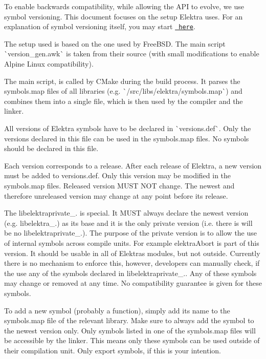 To enable backwards compatibility, while allowing the A\+PI to evolve, we use symbol versioning. This document focuses on the setup Elektra uses. For an explanation of symbol versioning itself, you may start \href{https://people.freebsd.org/~deischen/symver/library_versioning.txt}{\texttt{ here}}.

The setup used is based on the one used by Free\+B\+SD. The main script \`{}version\+\_\+gen.awk\`{} is taken from their source (with small modifications to enable Alpine Linux compatibility).

The main script, is called by C\+Make during the build process. It parses the {\ttfamily symbols.\+map} files of all libraries (e.\+g. \`{}/src/libs/elektra/symbols.map\`{}) and combines them into a single file, which is then used by the compiler and the linker.

All versions of Elektra symbols have to be declared in \`{}versions.def\`{}. Only the versions declared in this file can be used in the {\ttfamily symbols.\+map} files. No symbols should be declared in this file.

Each version corresponds to a release. After each release of Elektra, a new version must be added to {\ttfamily versions.\+def}. Only this version may be modified in the {\ttfamily symbols.\+map} files. Released version M\+U\+ST N\+OT change. The newest and therefore unreleased version may change at any point before its release.

The {\ttfamily libelektraprivate\+\_.} is special. It M\+U\+ST always declare the newest version (e.\+g. {\ttfamily libelektra\+\_.}) as its base and it is the only private version (i.\+e. there is will be no {\ttfamily libelektraprivate\+\_.}). The purpose of the private version is to allow the use of internal symbols across compile units. For example {\ttfamily elektra\+Abort} is part of this version. It should be usable in all of Elektra\textquotesingle{}s modules, but not outside. Currently there is no mechanism to enforce this, however, developers can manually check, if the use any of the symbols declared in {\ttfamily libelektraprivate\+\_.}. Any of these symbols may change or removed at any time. No compatibility guarantee is given for these symbols.

To add a new symbol (probably a function), simply add its name to the {\ttfamily symbols.\+map} file of the relevant library. Make sure to always add the symbol to the newest version only. Only symbols listed in one of the {\ttfamily symbols.\+map} files will be accessible by the linker. This means only these symbols can be used outside of their compilation unit. Only export symbols, if this is your intention.

